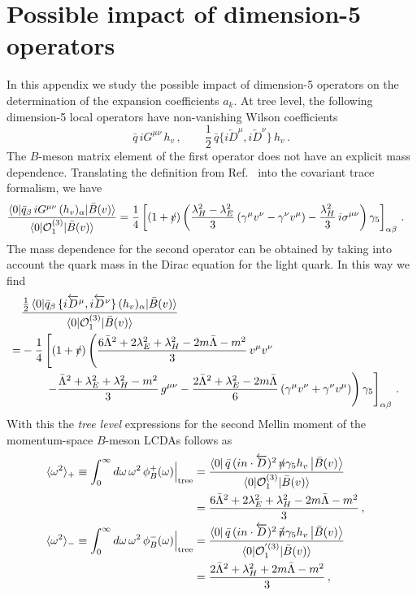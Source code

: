 \documentclass[a4paper,11pt]{article}
\begin{document}
\section{Possible impact of dimension-5 operators}
\label{sec:app-dim-5}

In this appendix we study the possible impact of dimension-5 operators on the determination of the expansion coefficients $a_k$.
%
At tree level, the following dimension-5 local operators have non-vanishing Wilson coefficients \cite{Grozin:1996pq}
$$
  \bar q \, iG^{\mu\nu} \, h_v \,, \qquad \frac12 \, \bar q \{ i\overleftarrow{D}^\mu, i \overleftarrow{D}^\nu \} \, h_v \,.
$$
The $B$-meson matrix element of the first operator does not have an explicit mass dependence. 
%
Translating the definition from Ref.~\cite{Grozin:1996pq} into the covariant trace formalism, we have
%
\begin{align}
    \frac{\langle 0|\bar q_\beta \, iG^{\mu\nu} \, (h_v)_\alpha| \bar{B}(v) \rangle}{\langle 0| {\cal O}_1^{(3)}| \bar{B}(v)\rangle }
    &= \frac14 \left[(1+\slashed v) \left( \frac{\lambda_H^2-\lambda_E^2}{3} \, (\gamma^\mu v^\nu -\gamma^\nu v^\mu) - \frac{\lambda_H^2}{3} \,
    i\sigma^{\mu\nu}\right) \gamma_5 \right]_{\alpha\beta} \,.
\end{align}
%
The mass dependence for the second operator can be obtained by taking into account the quark mass in the Dirac equation for the light quark.
In this way we find
\begin{align}
    & \frac{\frac12 \, \langle 0|\bar q_\beta \, \{ i \overleftarrow{D}^\mu,i \overleftarrow{D}^\nu \} \, (h_v)_\alpha| \bar{B} (v)\rangle}{\langle 0| {\cal O}_1^{(3)}| \bar{B}(v)\rangle}
    \cr 
    = & - \frac14 \left[(1+\slashed v) \left( 
      \frac{6\bar\Lambda^2 + 2 \lambda_E^2 + \lambda_H^2 - 2 m \bar\Lambda - m^2}{3} \,  v^\mu v^\nu \right. \right. 
      \cr 
      & \qquad  
     \left. \left. - \frac{\bar \Lambda^2 +\lambda_E^2+\lambda_H^2-m^2}{3} \, g^{\mu\nu} 
     - \frac{2\bar\Lambda^2 + \lambda_E^2- 2 m \bar\Lambda}{6} \, (\gamma^\mu v^\nu +\gamma^\nu v^\mu )
     \right) \gamma_5 \right]_{\alpha\beta} \,.
\end{align}
With this the \emph{tree level} expressions for the second Mellin moment of the momentum-space $B$-meson LCDAs
follows as
\begin{align} 
    \langle \omega^2 \rangle_+ 
        \equiv  \int_0^\infty d\omega \, \omega^2 \, \phi_B^+(\omega) \Big|_{\rm tree} 
        &= \frac{\bra{0} \bar q \, (i n\cdot \overleftarrow{D})^2 \, \slashed n \gamma_5 h_v \ket{\bar{B}(v)}}{\langle 0| {\cal O}_1^{(3)}| \bar{B}(v)\rangle } \cr
        &= \frac{6\bar\Lambda^2+2\lambda_E^2+\lambda_H^2 - 2 m\bar\Lambda - m^2}{3} \,, 
        \cr 
    \langle \omega^2 \rangle_-  \equiv \int_0^\infty d\omega \, \omega^2 \, \phi_B^-(\omega) \Big|_{\rm tree}
        &= \frac{\bra{0} \bar q \, (i n\cdot \overleftarrow{D})^2 \, \slashed{\bar n} \gamma_5 h_v \ket{\bar{B}(v)}}{\langle 0| {{\cal O}}_1^{'(3)}| \bar{B}(v)\rangle } \cr
        &= \frac{2\bar\Lambda^2+\lambda_H^2 + 2 m\bar\Lambda - m^2}{3} \,, 
\end{align}
\end{document}
